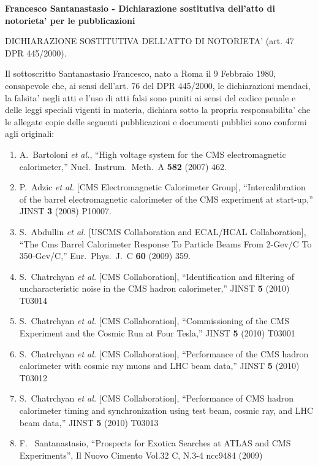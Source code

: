 \documentclass[10pt]{letter}
\begin{document}
{\large \sc \bf Francesco Santanastasio - Dichiarazione sostitutiva dell'atto di notorieta' per le pubblicazioni}

DICHIARAZIONE SOSTITUTIVA DELL'ATTO DI NOTORIETA' (art. 47 DPR 445/2000). 

Il sottoscritto Santanastasio Francesco, 
nato a Roma il 9 Febbraio 1980, consapevole che, ai sensi dell'art. 76 del DPR 445/2000, le dichiarazioni mendaci, 
la falsita' negli atti e l'uso di atti falsi sono puniti ai sensi del codice penale e delle leggi speciali vigenti 
in materia, dichiara sotto la propria responsabilita' che le allegate copie delle seguenti pubblicazioni e documenti 
pubblici sono conformi agli originali: 

\begin{enumerate}
\item A.~Bartoloni {\it et al.},
  ``High voltage system for the CMS electromagnetic calorimeter,''
  Nucl.\ Instrum.\ Meth.\  A {\bf 582} (2007) 462.
\item P.~Adzic {\it et al.}  [CMS Electromagnetic Calorimeter Group],
  ``Intercalibration of the barrel electromagnetic calorimeter of the CMS
  experiment at start-up,'' JINST {\bf 3} (2008) P10007.
\item S.~Abdullin {\it et al.}  [USCMS Collaboration and ECAL/HCAL Collaboration],
  ``The Cms Barrel Calorimeter Response To Particle Beams From 2-Gev/C To 350-Gev/C,''
  Eur.\ Phys.\ J.\  C {\bf 60} (2009) 359.
\item S.~Chatrchyan {\it et al.}  [CMS Collaboration],
  ``Identification and filtering of uncharacteristic noise in the CMS hadron calorimeter,''
  JINST {\bf 5} (2010) T03014
\item S.~Chatrchyan {\it et al.}  [CMS Collaboration],
  ``Commissioning of the CMS Experiment and the Cosmic Run at Four Tesla,''
  JINST {\bf 5} (2010) T03001
\item S.~Chatrchyan {\it et al.}  [CMS Collaboration],
  ``Performance of the CMS hadron calorimeter with cosmic ray muons and LHC beam data,''
  JINST {\bf 5} (2010) T03012
\item S.~Chatrchyan {\it et al.}  [CMS Collaboration],
  ``Performance of CMS hadron calorimeter timing and synchronization using test beam, cosmic ray, and LHC beam data,''
  JINST {\bf 5} (2010) T03013
\item F. ~Santanastasio, ``Prospects for Exotica Searches at ATLAS and CMS Experiments'', 
  Il Nuovo Cimento Vol.32 C, N.3-4 ncc9484 (2009)

\end{enumerate}
\end{document}
